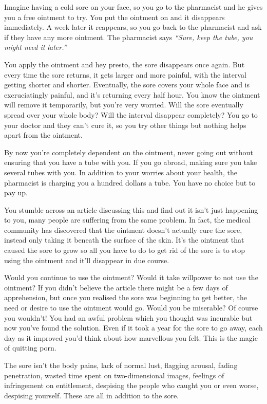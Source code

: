 \documentclass[
]{book}
\begin{document}
Imagine having a cold sore on your face, so you go to the pharmacist and he gives you a free ointment to try. You put the ointment on and it disappears immediately. A week later it reappears, so you go back to the pharmacist and ask if they have any more ointment. The pharmacist says \emph{``Sure, keep the tube, you might need it later.''}

You apply the ointment and hey presto, the sore disappears once again. But every time the sore returns, it gets larger and more painful, with the interval getting shorter and shorter. Eventually, the sore covers your whole face and is excruciatingly painful, and it's returning every half hour. You know the ointment will remove it temporarily, but you're very worried. Will the sore eventually spread over your whole body? Will the interval disappear completely? You go to your doctor and they can't cure it, so you try other things but nothing helps apart from the ointment.

By now you're completely dependent on the ointment, never going out without ensuring that you have a tube with you. If you go abroad, making sure you take several tubes with you. In addition to your worries about your health, the pharmacist is charging you a hundred dollars a tube. You have no choice but to pay up.

You stumble across an article discussing this and find out it isn't just happening to you, many people are suffering from the same problem. In fact, the medical community has discovered that the ointment doesn't actually cure the sore, instead only taking it beneath the surface of the skin. It's the ointment that caused the sore to grow so all you have to do to get rid of the sore is to stop using the ointment and it'll disappear in due course.

Would you continue to use the ointment? Would it take willpower to not use the ointment? If you didn't believe the article there might be a few days of apprehension, but once you realised the sore was beginning to get better, the need or desire to use the ointment would go. Would you be miserable? Of course you wouldn't! You had an awful problem which you thought was incurable but now you've found the solution. Even if it took a year for the sore to go away, each day as it improved you'd think about how marvellous you felt. This is the magic of quitting porn.

The sore isn't the body pains, lack of normal lust, flagging arousal, fading penetration, wasted time spent on two-dimensional images, feelings of infringement on entitlement, despising the people who caught you or even worse, despising yourself. These are all in addition to the sore.
\end{document}
